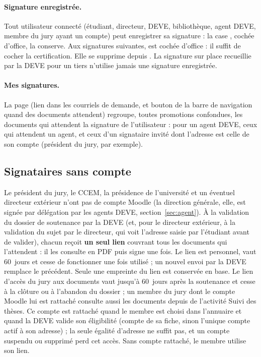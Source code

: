 \documentclass[11pt,a4paper]{article}
\begin{document}
\paragraph{Signature enregistrée.} Tout utilisateur connecté (étudiant,
directeur, DEVE, bibliothèque, agent DEVE, membre du jury ayant un compte)
peut enregistrer sa signature : la case , cochée d'office, la conserve. Aux signatures
suivantes,  est cochée d'office : il
suffit de cocher la certification. Elle se supprime depuis . La signature sur place recueillie par la DEVE pour un tiers
n'utilise jamais une signature enregistrée.

\paragraph{Mes signatures.} La page  (lien dans les
courriels de demande, et bouton de la barre de navigation quand des documents
attendent) regroupe, toutes promotions confondues, les documents qui attendent
la signature de l'utilisateur : pour un agent DEVE, ceux qui attendent un agent,
et ceux d'un signataire
invité dont l'adresse est celle de son compte (président du jury, par exemple).

\subsection{Signataires sans compte}

Le président du jury, le CCEM, la présidence de l'université et un éventuel
directeur extérieur n'ont pas de compte Moodle (la direction générale, elle, est
signée par délégation par les agents DEVE, section~\ref{sec:agent}).
À la validation du dossier de soutenance par la DEVE (et, pour le directeur
extérieur, à la validation du sujet par le directeur, qui voit l'adresse saisie
par l'étudiant avant de valider), chacun reçoit \textbf{un seul lien}
couvrant tous les documents qui l'attendent : il les consulte en PDF puis signe
une fois. Le lien est personnel, vaut 60~jours et cesse de fonctionner une fois
utilisé ; un nouvel envoi par la DEVE remplace le précédent. Seule une empreinte
du lien est conservée en base. Le lien d'accès du jury aux documents vaut
jusqu'à 60~jours après la soutenance et cesse à la clôture ou à l'abandon du
dossier ; un membre du jury dont le compte Moodle lui est rattaché consulte
aussi les documents depuis  de l'activité \og Suivi des
thèses\fg{}. Ce compte est rattaché quand le membre est choisi dans l'annuaire
et quand la DEVE valide son éligibilité (compte de sa fiche, sinon l'unique
compte actif à son adresse) ; la seule égalité d'adresse ne suffit pas, et un
compte suspendu ou supprimé perd cet accès. Sans compte rattaché, le membre
utilise son lien.
\end{document}
